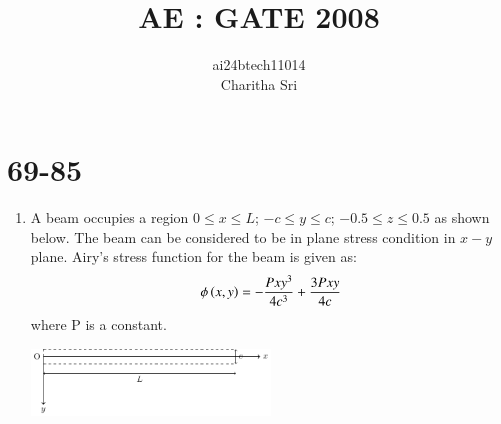\documentclass[journal,12pt,onecolumn]{IEEEtran}
\theoremstyle{remark}
\begin{document}

\vspace{3cm}

\title{AE : GATE 2008}
\author{ai24btech11014 \\ Charitha Sri}

\maketitle
\bigskip       
\renewcommand{\thefigure}{\theenumi}
\renewcommand{\thetable}{\theenumi}

\section{ 69-85}

\begin{enumerate}
\item A beam occupies a region $0\leq x \leq L$; $-c \leq y \leq c$; $ -0.5 \leq z \leq 0.5 $ as shown below. The beam can be considered to be in plane stress condition in $x-y$ plane. Airy's stress function for the beam is given as:
      \begin{align}
      \phi \left(x, y\right) = -\frac{Px{y}^3}{4{c}^3}+\frac{3Pxy}{4c}
      \end{align}
      where P is a constant.


\begin{center}
	\includegraphics[width=0.5\textwidth]{image/fig1/fig1.pdf}
\end{center}


\end{enumerate}
\end{document}
